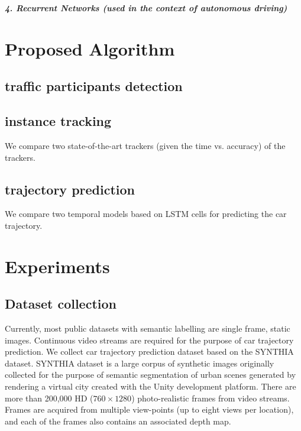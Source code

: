 \documentclass[10pt,twocolumn,letterpaper]{article}
\begin{document}
\textbf{\emph{4. Recurrent Networks (used in the context of autonomous driving)}}

\section{Proposed Algorithm}

\subsection{traffic participants detection}


\subsection{instance tracking}

We compare two state-of-the-art trackers (given the time vs. accuracy) of the trackers.

\subsection{trajectory prediction}

We compare two temporal models based on LSTM cells for predicting the car trajectory.


\section{Experiments}

\subsection{Dataset collection}

Currently, most public datasets with semantic labelling are single frame, static images. Continuous video streams are required for the purpose of car trajectory prediction.
We collect car trajectory prediction dataset based on the SYNTHIA~\cite{ros2016synthia} dataset.
SYNTHIA dataset is a large corpus of synthetic images originally collected for the purpose of semantic segmentation of urban scenes generated by rendering a virtual city created with the Unity development platform.
There are more than 200,000 HD ($760\times1280$) photo-realistic frames from video streams.
Frames are acquired from multiple view-points (up to eight views per location), and each of the frames also contains an associated depth map.
\end{document}
